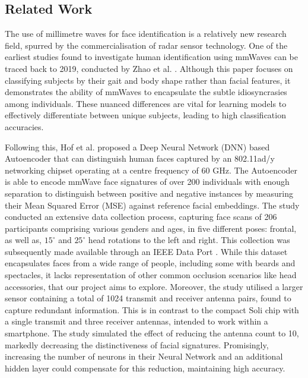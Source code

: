 \documentclass{mpaper}
\begin{document}
\subsection{Related Work}
The use of millimetre waves for face identification is a relatively new research field, spurred by the commercialisation of radar sensor technology. One of the earliest studies found to investigate human identification using mmWaves can be traced back to 2019, conducted by Zhao et al. \cite{zhao2019mid}. Although this paper focuses on classifying subjects by their gait and body shape rather than facial features, it demonstrates the ability of mmWaves to encapsulate the subtle idiosyncrasies among individuals. These nuanced differences are vital for learning models to effectively differentiate between unique subjects, leading to high classification accuracies.

Following this, Hof et al. \cite{hof2020face} proposed a Deep Neural Network (DNN) based Autoencoder that can distinguish human faces captured by an 802.11ad/y networking chipset operating at a centre frequency of 60 GHz. The Autoencoder is able to encode mmWave face signatures of over 200 individuals with enough separation to distinguish between positive and negative instances by measuring their Mean Squared Error (MSE) against reference facial embeddings. The study conducted an extensive data collection process, capturing face scans of 206 participants comprising various genders and ages, in five different poses: frontal, as well as, $15^\circ$ and $25^\circ$ head rotations to the left and right. This collection was subsequently made available through an IEEE Data Port \cite{mmwavefacedata}. While this dataset encapsulates faces from a wide range of people, including some with beards and spectacles, it lacks representation of other common occlusion scenarios like head accessories, that our project aims to explore. Moreover, the study utilised a larger sensor containing a total of 1024 transmit and receiver antenna pairs, found to capture redundant information. This is in contrast to the compact Soli chip with a single transmit and three receiver antennas, intended to work within a smartphone. The study simulated the effect of reducing the antenna count to 10, markedly decreasing the distinctiveness of facial signatures. Promisingly, increasing the number of neurons in their Neural Network and an additional hidden layer could compensate for this reduction, maintaining high accuracy.
\end{document}
